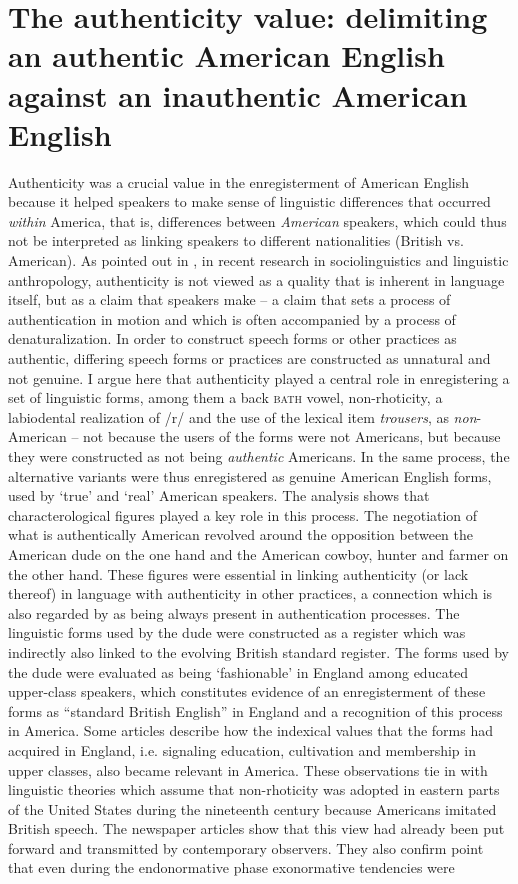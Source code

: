 \section[The authenticity value]{The authenticity value: delimiting an authentic American English against an inauthentic American English}
\label{bkm:Ref2158524}\hypertarget{Toc63021248}{}
Authenticity was a crucial value in the enregisterment of American English because it helped speakers to make sense of linguistic differences that occurred \emph{within} America, that is, differences between \emph{American} speakers, which could thus not be interpreted as linking speakers to different nationalities (British vs. American). As pointed out in , in recent research in sociolinguistics and linguistic anthropology, authenticity is not viewed as a quality that is inherent in language itself, but as a claim that speakers make – a claim that sets a process of authentication in motion and which is often accompanied by a process of denaturalization. In order to construct speech forms or other practices as authentic, differing speech forms or practices are constructed as unnatural and not genuine. I argue here that authenticity played a central role in enregistering a set of linguistic forms, among them a back \textsc{bath} vowel, non-rhoticity, a labiodental realization of /r/ and the use of the lexical item \emph{trousers}, as \emph{non}{}-American – not because the users of the forms were not Americans, but because they were constructed as not being \emph{authentic} Americans. In the same process, the alternative variants were thus enregistered as genuine American English forms, used by ‘true’ and ‘real’ American speakers. The analysis shows that characterological figures played a key role in this process. The negotiation of what is authentically American revolved around the opposition between the American dude on the one hand and the American cowboy, hunter and farmer on the other hand. These figures were essential in linking authenticity (or lack thereof) in language with authenticity in other practices, a connection which is also regarded by \citet[109]{Johnstone2014} as being always present in authentication processes. The linguistic forms used by the dude were constructed as a register which was indirectly also linked to the evolving British standard register. The forms used by the dude were evaluated as being ‘fashionable’ in England among educated upper-class speakers, which constitutes evidence of an enregisterment of these forms as “standard British English” in England and a recognition of this process in America. Some articles describe how the indexical values that the forms had acquired in England, i.e. signaling education, cultivation and membership in upper classes, also became relevant in America. These observations tie in with linguistic theories which assume that non-rhoticity was adopted in eastern parts of the United States during the nineteenth century because Americans imitated British speech. The newspaper articles show that this view had already been put forward and transmitted by contemporary observers. They also confirm  point that even during the endonormative phase exonormative tendencies were 